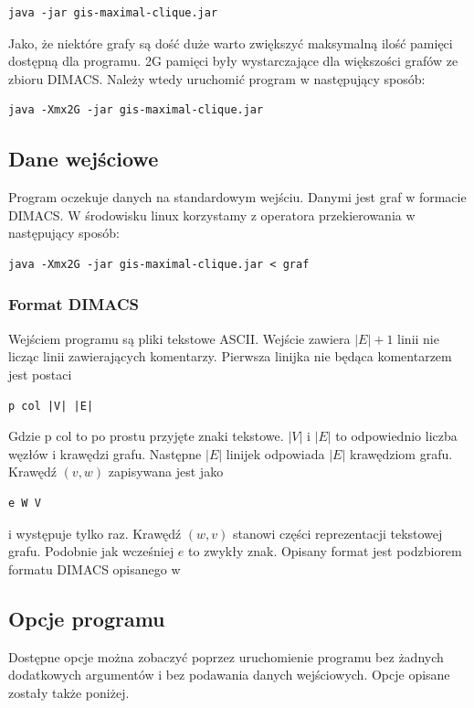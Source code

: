 \documentclass[12pt, a4paper]{article}
\begin{document}
\begin{verbatim}
java -jar gis-maximal-clique.jar
\end{verbatim}

Jako, że niektóre grafy są dość duże warto zwiększyć maksymalną ilość pamięci dostępną dla programu. 2G pamięci były wystarczające dla większości grafów ze zbioru DIMACS. Należy wtedy uruchomić program w następujący sposób:

\begin{verbatim}
java -Xmx2G -jar gis-maximal-clique.jar
\end{verbatim}

\subsection{Dane wejściowe}
Program oczekuje danych na standardowym wejściu. Danymi jest graf w formacie DIMACS. W środowisku linux korzystamy z operatora przekierowania w następujący sposób:

\begin{verbatim}
java -Xmx2G -jar gis-maximal-clique.jar < graf
\end{verbatim}

\subsubsection{Format DIMACS}

Wejściem programu są pliki tekstowe ASCII. Wejście zawiera $|E|+1$ linii nie licząc linii zawierających komentarzy. Pierwsza linijka nie będąca komentarzem jest postaci 
\begin{verbatim}
p col |V| |E|
\end{verbatim}
Gdzie $\text{p col}$ to po prostu przyjęte znaki tekstowe. $|V|$ i $|E|$ to odpowiednio liczba węzłów i krawędzi grafu. Następne $|E|$ linijek odpowiada $|E|$ krawędziom grafu. Krawędź $(v, w)$ zapisywana jest jako 
\begin{verbatim}
e W V
\end{verbatim}
i występuje tylko raz. Krawędź $(w, v)$ stanowi części reprezentacji tekstowej grafu. Podobnie jak wcześniej $e$ to zwykły znak. Opisany format jest podzbiorem formatu DIMACS opisanego w \cite{dimacs_format}

\subsection{Opcje programu}
Dostępne opcje można zobaczyć poprzez uruchomienie programu bez żadnych dodatkowych argumentów i bez podawania danych wejściowych. Opcje opisane zostały także poniżej.
\end{document}
